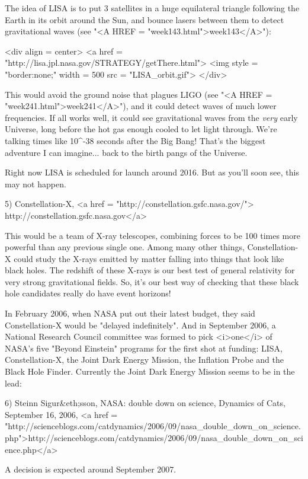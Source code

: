 The idea of LISA is to put 3 satellites in a huge equilateral triangle
following the Earth in its orbit around the Sun, and bounce lasers
between them to detect gravitational waves (see "<A HREF =
"week143.html">week143</A>"):

<div align = center>
<a href = "http://lisa.jpl.nasa.gov/STRATEGY/getThere.html">
<img style = "border:none;" width = 500 src = "LISA_orbit.gif">
</div>

This would avoid the ground noise that plagues LIGO (see "<A HREF
= "week241.html">week241</A>"), and it could detect waves of much
lower frequencies.  If all works well, it could see gravitational
waves from the \emph{very} early Universe, long before the hot gas enough
cooled to let light through.  We're talking times like 10^{-38}
seconds after the Big Bang!  That's the biggest adventure I can
imagine... back to the birth pangs of the Universe.

Right now LISA is scheduled for launch around 2016.  But as you'll soon
see, this may not happen.


5) Constellation-X, <a href = "http://constellation.gsfc.nasa.gov/">
http://constellation.gsfc.nasa.gov</a>

This would be a team of X-ray telescopes, combining forces to be 100
times more powerful than any previous single one.  Among many other things,
Constellation-X could study the X-rays emitted by matter falling into things 
that look like black holes.  The redshift of these X-rays is our best test 
of general relativity for very strong gravitational fields.  So, it's our
best way of checking that these black hole candidates really do have event 
horizons!

In February 2006, when NASA put out their latest budget, they said
Constellation-X would be "delayed indefinitely".  And in
September 2006, a National Research Council committee was formed to
pick <i>one</i> of NASA's five "Beyond Einstein" programs
for the first shot at funding: LISA, Constellation-X, the Joint Dark
Energy Mission, the Inflation Probe and the Black Hole Finder.
Currently the Joint Dark Energy Mission seems to be in the lead:

6) Steinn Sigur&eth;sson, NASA: double down on science, Dynamics of
Cats, September 16, 2006, <a href = "http://scienceblogs.com/catdynamics/2006/09/nasa_double_down_on_science.php">http://scienceblogs.com/catdynamics/2006/09/nasa_double_down_on_science.php</a>

A decision is expected around September 2007.

